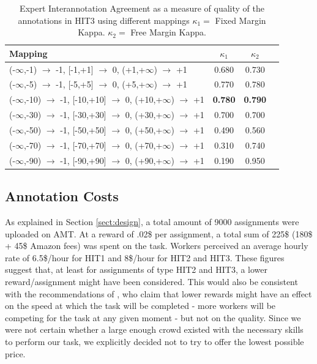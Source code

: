 \documentclass[11pt, a4paper,onecolumn]{article}
\begin{document}
\begin{table}[h]
\begin{center}
\begin{tabular}{|l|c|c|c|}
\hline
Mapping & $\kappa_{1}$ & $\kappa_{2}$ \\ 
\hline
 (-$\infty$,-1) $\rightarrow$ -1, [-1,+1] $\rightarrow$ 0, (+1,+$\infty$) $\rightarrow$ +1& 0.680 & 0.730\\ \hline
 (-$\infty$,-5) $\rightarrow$ -1, [-5,+5] $\rightarrow$ 0, (+5,+$\infty$) $\rightarrow$ +1& 0.770 & 0.780\\ \hline
 (-$\infty$,-10) $\rightarrow$ -1, [-10,+10] $\rightarrow$ 0, (+10,+$\infty$) $\rightarrow$ +1& \textbf{0.780} & \textbf{0.790}\\ \hline
 (-$\infty$,-30) $\rightarrow$ -1, [-30,+30] $\rightarrow$ 0, (+30,+$\infty$) $\rightarrow$ +1& 0.700 & 0.700\\ \hline
 (-$\infty$,-50) $\rightarrow$ -1, [-50,+50] $\rightarrow$ 0, (+50,+$\infty$) $\rightarrow$ +1& 0.490 & 0.560\\ \hline
 (-$\infty$,-70) $\rightarrow$ -1, [-70,+70] $\rightarrow$ 0, (+70,+$\infty$) $\rightarrow$ +1& 0.310 & 0.740\\ \hline
(-$\infty$,-90) $\rightarrow$ -1, [-90,+90] $\rightarrow$ 0, (+90,+$\infty$) $\rightarrow$ +1& 0.190 & 0.950\\ \hline
\end{tabular}
\end{center}
\caption{Expert Interannotation Agreement as a measure of quality of the annotations in HIT3 using different mappings $\kappa_{1} = $ Fixed Margin Kappa. $\kappa_{2} = $ Free Margin Kappa.}
\label{tablita3}
\end{table}




\subsection{Annotation Costs}
\label{sect:costs}

As explained in Section \ref{sect:design}, a total amount of 9000 assignments were uploaded on AMT. At a reward of .02\$ per assignment, a total sum of 225\$ (180\$ + 45\$ Amazon fees) was spent on the task. Workers perceived an average hourly rate of 6.5\$/hour for HIT1 and 8\$/hour for HIT2 and HIT3. These figures suggest that, at least for assignments of type HIT2 and HIT3, a lower reward/assignment might have been considered. This would also be consistent with the recommendations of \cite{mason_financial_2009}, who claim that lower rewards might have an effect on the speed at which the task will be completed - more workers will be competing for the task at any given moment - but not on the quality. Since we were not certain whether a large enough crowd existed with the necessary skills to perform our task, we explicitly decided not to try to offer the lowest possible price.
\end{document}
